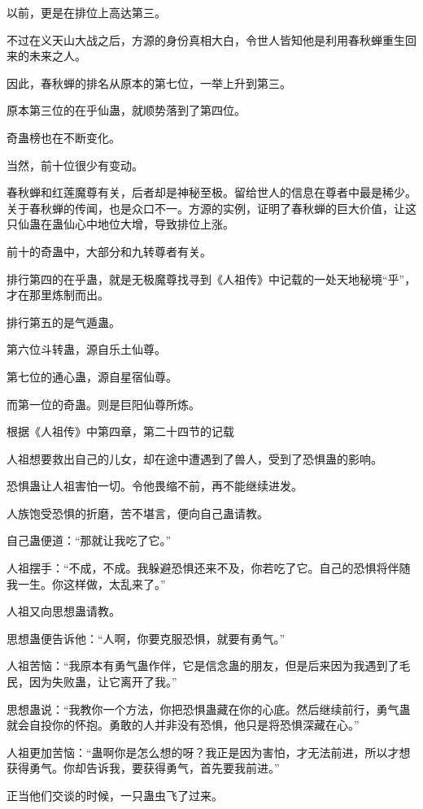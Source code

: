 \begin{this_body}
以前，更是在排位上高达第三。

不过在义天山大战之后，方源的身份真相大白，令世人皆知他是利用春秋蝉重生回来的未来之人。

因此，春秋蝉的排名从原本的第七位，一举上升到第三。

原本第三位的在乎仙蛊，就顺势落到了第四位。

奇蛊榜也在不断变化。

当然，前十位很少有变动。

春秋蝉和红莲魔尊有关，后者却是神秘至极。留给世人的信息在尊者中最是稀少。关于春秋蝉的传闻，也是众口不一。方源的实例，证明了春秋蝉的巨大价值，让这只仙蛊在蛊仙心中地位大增，导致排位上涨。

前十的奇蛊中，大部分和九转尊者有关。

排行第四的在乎蛊，就是无极魔尊找寻到《人祖传》中记载的一处天地秘境“乎”，才在那里炼制而出。

排行第五的是气遁蛊。

第六位斗转蛊，源自乐土仙尊。

第七位的通心蛊，源自星宿仙尊。

而第一位的奇蛊。则是巨阳仙尊所炼。

根据《人祖传》中第四章，第二十四节的记载

人祖想要救出自己的儿女，却在途中遭遇到了兽人，受到了恐惧蛊的影响。

恐惧蛊让人祖害怕一切。令他畏缩不前，再不能继续进发。

人族饱受恐惧的折磨，苦不堪言，便向自己蛊请教。

自己蛊便道：“那就让我吃了它。”

人祖摆手：“不成，不成。我躲避恐惧还来不及，你若吃了它。自己的恐惧将伴随我一生。你这样做，太乱来了。”

人祖又向思想蛊请教。

思想蛊便告诉他：“人啊，你要克服恐惧，就要有勇气。”

人祖苦恼：“我原本有勇气蛊作伴，它是信念蛊的朋友，但是后来因为我遇到了毛民，因为失败蛊，让它离开了我。”

思想蛊说：“我教你一个方法，你把恐惧蛊藏在你的心底。然后继续前行，勇气蛊就会自投你的怀抱。勇敢的人并非没有恐惧，他只是将恐惧深藏在心。”

人祖更加苦恼：“蛊啊你是怎么想的呀？我正是因为害怕，才无法前进，所以才想获得勇气。你却告诉我，要获得勇气，首先要我前进。”

正当他们交谈的时候，一只蛊虫飞了过来。


\end{this_body}
